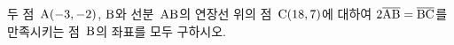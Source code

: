 두 점~$\mathrm{A}(-3{,}\mkern3mu\mathopen{}-2)$, $\mathrm{B}$와 선분~$\mathrm{AB}$의 연장선 위의 점~$\mathrm{C}(18{,}\mkern3mu\mathopen{}7)$에 대하여 $2\overline{\mathrm{AB}}=\overline{\mathrm{BC}}$를 만족시키는 점~$\mathrm{B}$의 좌표를 모두 구하시오.
